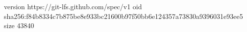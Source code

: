 version https://git-lfs.github.com/spec/v1
oid sha256:f84b8334c7b875be8e933bc21600b97f50bb6e124357a73830a9396031e93ee5
size 43840
